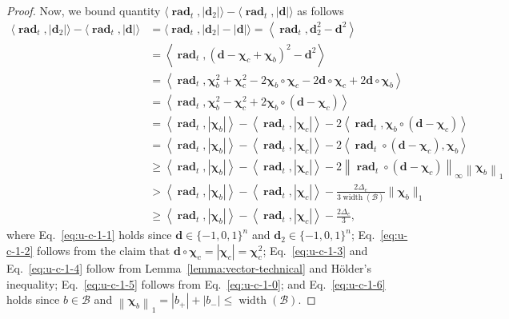 \documentclass{article}
\newcommand{\B}{\mathcal B}
\DeclareMathOperator{\rank}{width}
\DeclareMathOperator{\rad}{rad}
\newcommand{\nor}[1]{\left\|#1\right\|}
\renewcommand{\vec}[1]{\boldsymbol{#1}}
\renewcommand{\odot}{\circ}
\begin{document}
\begin{spacing}{1.1}
\begin{proof}
Now, we bound  quantity $\langle \vec \rad_t, |\vec d_2| \rangle - \langle \vec \rad_t, |\vec d| \rangle$ as follows
\begin{align}
\langle \vec \rad_t, |\vec d_2| \rangle - \langle \vec \rad_t, |\vec d| \rangle &=
\langle \vec \rad_t, |\vec d_2|-|\vec d| \rangle = \left\langle \vec \rad_t, \vec d_2^2- \vec d^2 \right\rangle
\label{eq:u-c-1-1} \\
&= \left\langle \vec \rad_t, (\vec d-\vec \chi_c+\vec \chi_b)^2- \vec d^2 \right\rangle 
\nonumber \\
&= \left\langle \vec \rad_t, \vec \chi_b^2+\vec \chi_c^2-2\vec \chi_b\odot \vec \chi_c -
						  2\vec d \odot \vec \chi_c + 2\vec d\odot\vec \chi_b \right\rangle
\nonumber \\
&= \left\langle \vec \rad_t, \vec \chi_b^2 - \vec \chi_c^2+2\vec \chi_b\odot (\vec d-\vec \chi_c)\right\rangle
\label{eq:u-c-1-2}\\
&= \left\langle \vec \rad_t, |\vec\chi_b| \right\rangle
  -\left\langle \vec \rad_t, |\vec\chi_c| \right\rangle
  -2\left\langle \vec \rad_t, \vec \chi_b\odot (\vec d-\vec \chi_c) \right\rangle
  \nonumber \\
&= \left\langle \vec \rad_t, |\vec\chi_b| \right\rangle
  -\left\langle \vec \rad_t, |\vec\chi_c| \right\rangle
  -2\left\langle \vec \rad_t \odot (\vec d-\vec \chi_c), \vec \chi_b \right\rangle
  \label{eq:u-c-1-3}\\  
& \ge \left\langle \vec \rad_t, |\vec\chi_b| \right\rangle
  -\left\langle \vec \rad_t, |\vec\chi_c| \right\rangle
  -2\left\|\vec \rad_t \odot (\vec d-\vec \chi_c)\right\|_\infty \left\| \vec \chi_b\right\|_1
  \label{eq:u-c-1-4} \\
& > \left\langle \vec \rad_t, |\vec\chi_b| \right\rangle
  -\left\langle \vec \rad_t, |\vec\chi_c| \right\rangle
  -\frac{2\Delta_e}{3\rank(\B)} \|\vec\chi_b\|_1 
  \label{eq:u-c-1-5}\\
& \ge \left\langle \vec \rad_t, |\vec\chi_b| \right\rangle
  -\left\langle \vec \rad_t, |\vec\chi_c| \right\rangle
  -\frac{2\Delta_e}{3}
  \label{eq:u-c-1-6},
\end{align}
where Eq.~\eqref{eq:u-c-1-1} holds since $\vec d\in \{-1,0,1\}^n$ and $\vec d_2\in \{-1,0,1\}^n$;
Eq.~\eqref{eq:u-c-1-2} follows from the claim that $\vec d \odot \vec \chi_c = |\vec \chi_c|=\vec\chi_c^2$;
Eq.~\eqref{eq:u-c-1-3} and Eq.~\eqref{eq:u-c-1-4} follow from Lemma~\ref{lemma:vector-technical} and H\"older's inequality;
Eq.~\eqref{eq:u-c-1-5} follows from Eq.~\eqref{eq:u-c-1-0};
and Eq.~\eqref{eq:u-c-1-6} holds since $b\in\B$ and $\nor{\vec\chi_b}_1 = |b_+|+|b_-| \le \rank(\B)$.


\end{proof}
\end{spacing}
\end{document}
